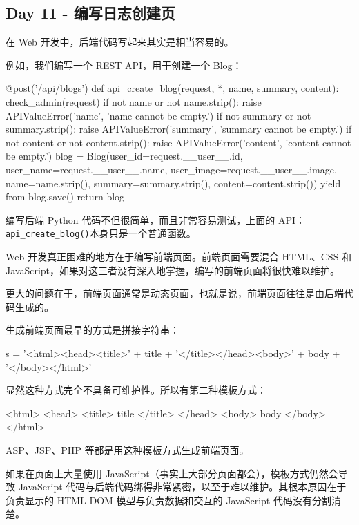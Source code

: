 \hypertarget{day-11---ux7f16ux5199ux65e5ux5fd7ux521bux5efaux9875}{%
\subsection{Day 11 -
编写日志创建页}\label{day-11---ux7f16ux5199ux65e5ux5fd7ux521bux5efaux9875}}

在 Web 开发中，后端代码写起来其实是相当容易的。

例如，我们编写一个 REST API，用于创建一个 Blog：

\begin{pythoncode}
@post('/api/blogs')
def api_create_blog(request, *, name, summary, content):
    check_admin(request)
    if not name or not name.strip():
        raise APIValueError('name', 'name cannot be empty.')
    if not summary or not summary.strip():
        raise APIValueError('summary', 'summary cannot be empty.')
    if not content or not content.strip():
        raise APIValueError('content', 'content cannot be empty.')
    blog = Blog(user_id=request.__user__.id, user_name=request.__user__.name, user_image=request.__user__.image, name=name.strip(), summary=summary.strip(), content=content.strip())
    yield from blog.save()
    return blog
\end{pythoncode}

编写后端 Python 代码不但很简单，而且非常容易测试，上面的
API：\texttt{api\_create\_blog()}本身只是一个普通函数。

Web 开发真正困难的地方在于编写前端页面。前端页面需要混合 HTML、CSS 和
JavaScript，如果对这三者没有深入地掌握，编写的前端页面将很快难以维护。

更大的问题在于，前端页面通常是动态页面，也就是说，前端页面往往是由后端代码生成的。

生成前端页面最早的方式是拼接字符串：

\begin{pythoncode}
s = '<html><head><title>'
    + title
    + '</title></head><body>'
    + body
    + '</body></html>'
\end{pythoncode}

显然这种方式完全不具备可维护性。所以有第二种模板方式：

\begin{pythoncode}
<html>
<head>
    <title>{{ title }}</title>
</head>
<body>
    {{ body }}
</body>
</html>
\end{pythoncode}

ASP、JSP、PHP 等都是用这种模板方式生成前端页面。

如果在页面上大量使用
JavaScript（事实上大部分页面都会），模板方式仍然会导致 JavaScript
代码与后端代码绑得非常紧密，以至于难以维护。其根本原因在于负责显示的
HTML DOM 模型与负责数据和交互的 JavaScript 代码没有分割清楚。

